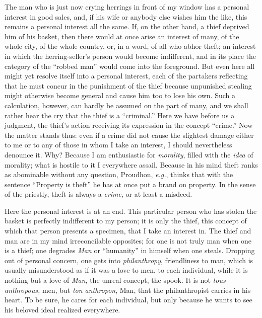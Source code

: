The man who is just now crying herrings in front of my window has a personal 
interest in good sales, and, if his wife or anybody else wishes him the like, 
this remains a personal interest all the same. If, on the other hand, a thief 
deprived him of his basket, then there would at once arise an interest of 
many, of the whole city, of the whole country, or, in a word, of all who abhor 
theft; an interest in which the herring-seller's person would become 
indifferent, and in its place the category of the ``robbed man'' would come 
into the foreground. But even here all might yet resolve itself into a 
personal interest, each of the partakers reflecting that he must concur in the 
punishment of the thief because unpunished stealing might otherwise become 
general and cause him too to lose his own. Such a calculation, however, can 
hardly be assumed on the part of many, and we shall rather hear the cry that 
the thief is a ``criminal.'' Here we have before us a judgment, the thief's 
action receiving its expression in the concept ``crime.'' Now the matter 
stands thus: even if a crime did not cause the slightest damage either to me 
or to any of those in whom I take an interest, I should nevertheless denounce 
it. Why? Because I am enthusiastic for \textit{morality}, filled with the 
\textit{idea} of morality; what is hostile to it I everywhere assail. Because 
in his mind theft ranks as abominable without any question, Proudhon, 
\textit{e.g.}, thinks that with the sentence ``Property is theft'' he has 
at once put a brand on property. In the sense of the priestly, theft is always 
a \textit{crime}, or at least a misdeed.

Here the personal interest is at an end. This particular person who has stolen 
the basket is perfectly indifferent to my person; it is only the thief, this 
concept of which that person presents a specimen, that I take an interest in. 
The thief and man are in my mind irreconcilable opposites; for one is not 
truly man when one is a thief; one degrades \textit{Man} or ``humanity'' in 
himself when one steals. Dropping out of personal concern, one gets into 
\textit{philanthropy}, friendliness to man, which is usually misunderstood as 
if it was a love to men, to each individual, while it is nothing but a love of 
\textit{Man}, the unreal concept, the spook. It is not \textit{tous 
anthropous,} men, but \textit{ton anthropon}, Man, that the philanthropist 
carries in his heart. To be sure, he cares for each individual, but only 
because he wants to see his beloved ideal realized everywhere.

